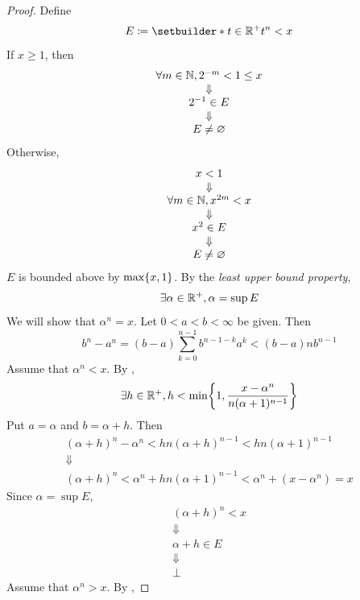 \begin{proof}
    Define
    \[
    E \coloneqq \setbuilder*{t \in \R^{+}}{t^{n} < x}
    \]
    If $x \geq 1$, then
    \[
    \begin{array}{c}
        \forall m \in \mathbb{N}, 2^{-m} < 1 \leq x \\
        \Downarrow \\
        2^{-1} \in E \\
        \Downarrow \\
        E \neq \varnothing
    \end{array}
    \]
    Otherwise,
    \[
    \begin{array}{c}
        x < 1 \\
        \Downarrow \\
        \forall m \in \mathbb{N}, x^{2m} < x \\
        \Downarrow \\
        x^{2} \in E \\
        \Downarrow \\
        E \neq \varnothing
    \end{array}
    \]
    $E$ is bounded above by $\max\set*{x, 1}$. By the \emph{least upper bound property},
    \[
    \exists \alpha \in \mathbb{R}^{+}, \alpha = \sup E
    \]
    We will show that $\alpha^{n} = x$. Let $0 < a < b < \infty$ be given. Then
    \[
    b^{n} - a^{n} = (b - a)\sum_{k = 0}^{n - 1} b^{n - 1 - k} a^{k} < (b - a)nb^{n - 1}
    \]
    Assume that $\alpha^{n} < x$. By ,
    \[
    \exists h \in \R^{+}, h < \min\set*{1, \frac{x - \alpha^{n}}{n(\alpha + 1)^{n - 1}}}
    \]
    Put $a = \alpha$ and $b = \alpha + h$. Then
    \[
    \begin{array}{c}
        (\alpha + h)^{n} - \alpha^{n} < hn(\alpha + h)^{n - 1} < hn(\alpha + 1)^{n - 1} \\
        \Downarrow \\
        (\alpha + h)^{n} < \alpha^{n} + hn(\alpha + 1)^{n - 1} < \alpha^{n} + (x - \alpha^{n}) = x
    \end{array}
    \]
    Since $\alpha = \sup E$,
    \[
    \begin{array}{c}
        (\alpha + h)^{n} < x \\
        \Downarrow \\
        \alpha + h \in E \\
        \Downarrow \\
        \bot
    \end{array}
    \]
    Assume that $\alpha^{n} > x$. By ,

\end{proof}
